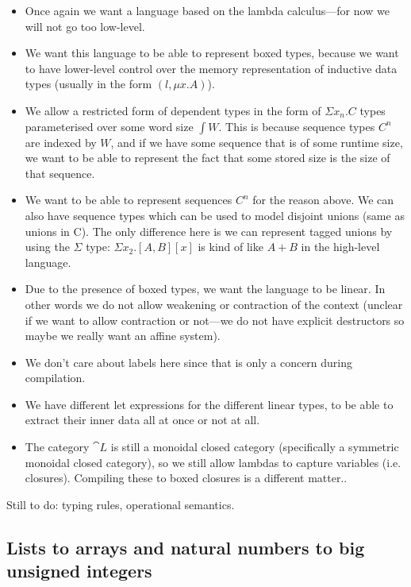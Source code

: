 \begin{itemize}
  \item Once again we want a language based on the lambda calculus---for now we will
        not go too low-level.
  \item We want this language to be able to represent boxed types, because we want to
        have lower-level control over the memory representation of inductive data types
        (usually in the form $(l, \mu x . A)$).
  \item We allow a restricted form of dependent types in the form of $\Sigma x_n . C$
        types parameterised over some word size $\int W$. This is because sequence
        types $C^n$ are indexed by $W$, and if we have some sequence that is of some
        runtime size, we want to be able to represent the fact that some stored size is
        the size of that sequence.
  \item We want to be able to represent sequences $C^n$ for the reason above. We can
        also have sequence types which can be used to model disjoint unions (same as
        unions in C). The only difference here is we can represent tagged unions by
        using the $\Sigma$ type: $\Sigma x_2 . [A, B][x]$ is kind of like $A + B$ in
        the high-level language.
  \item Due to the presence of boxed types, we want the language to be linear. In other
        words we do not allow weakening or contraction of the context (unclear if we
        want to allow contraction or not---we do not have explicit destructors so maybe
        we really want an affine system).
  \item We don't care about labels here since that is only a concern during
        compilation.
  \item We have different let expressions for the different linear types, to be able to
        extract their inner data all at once or not at all.
  \item The category $\cat L$ is still a monoidal closed category (specifically a
        symmetric monoidal closed category), so we still allow lambdas to capture
        variables (i.e. closures). Compiling these to boxed closures is a different
        matter..
\end{itemize}

Still to do: typing rules, operational semantics.

\subsection{Lists to arrays and natural numbers to big unsigned integers}


